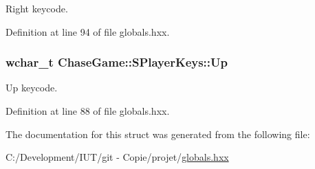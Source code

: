Right keycode. 



Definition at line 94 of file globals.\-hxx.

\hypertarget{struct_chase_game_1_1_s_player_keys_a0153d90bee31d3959e7a79377c4dd927}{
\subsubsection[{Up}]{\setlength{\rightskip}{0pt plus 5cm}wchar\-\_\-t Chase\-Game\-::\-S\-Player\-Keys\-::\-Up}}\label{struct_chase_game_1_1_s_player_keys_a0153d90bee31d3959e7a79377c4dd927}


Up keycode. 



Definition at line 88 of file globals.\-hxx.



The documentation for this struct was generated from the following file\-:\begin{DoxyCompactItemize}
\item 
C\-:/\-Development/\-I\-U\-T/git -\/ Copie/projet/\hyperlink{globals_8hxx}{globals.\-hxx}\end{DoxyCompactItemize}
